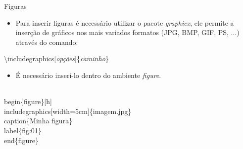 \begin{frame}[fragile]{Figuras}
    \begin{itemize}
    \item Para inserir figuras é necessário utilizar o pacote \textit{graphicx}, ele permite a inserção de gráficos nos mais variados formatos (JPG, BMP, GIF, PS, ...) através do comando:
    \end{itemize}
    
    \alert{\textbackslash includegraphics[\textit{opções}]\{\textit{caminho}\}}

    \begin{itemize}
    \item É necessário inserí-lo dentro do ambiente \textit{figure}.
    \end{itemize}

    \begin{example}
        \begin{semiverbatim}
\small\\begin\{figure\}[h]
\\includegraphics[width=5cm]\{imagem.jpg\}
\\caption\{Minha figura\}
\\label\{fig:01\}
\\end\{figure\}
\end{semiverbatim}
    \end{example}
\end{frame}



